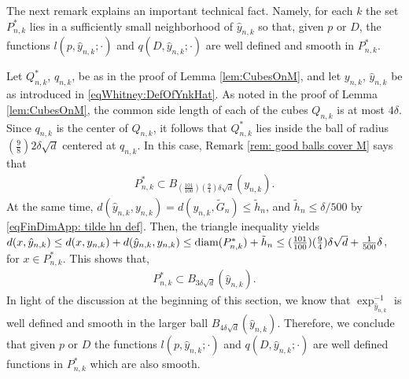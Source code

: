 \documentclass[11pt,reqno]{amsart}
\numberwithin{equation}{section}
\theoremstyle{plain}
\def\diam{\textnormal{diam}}
\begin{document}
  The next remark explains an important technical fact. Namely, for each $k$ the set $P_{n,k}^*$ lies in a sufficiently small neighborhood of $\hat y_{n,k}$ so that, given $p$ or $D$, the functions $l(p,\hat y_{n,k};\cdot)$ and $q(D,\hat y_{n,k};\cdot)$ are well defined and smooth in $P_{n,k}^*$.
  \begin{rem}\label{rem:local interpolators are well defined}
    Let $Q_{n,k}^*$, $q_{n,k}$, be as in the proof of Lemma \ref{lem:CubesOnM}, and let $y_{n,k}$, $\hat y_{n,k}$ be as introduced in \eqref{eqWhitney:DefOfYnkHat}.  As noted in the proof of Lemma \ref{lem:CubesOnM}, the common side length of each of the cubes $Q_{n,k}$ is at most $4\delta$. Since $q_{n,k}$ is the center of $Q_{n,k}$, it follows that $Q_{n,k}^*$ lies inside the ball of radius $(\tfrac{9}{8})2\delta \sqrt{d}$ centered at $q_{n,k}$. In this case, Remark \ref{rem: good balls cover M} says that
    \begin{align*}	
       P_{n,k}^* \subset B_{(\tfrac{101}{100})(\tfrac{9}{4})\delta \sqrt{d}}(y_{n,k}).
    \end{align*}	
    At the same time, $d(\hat y_{n,k},y_{n,k}) = d(y_{n,k},\tilde G_n)\leq \tilde h_n$, and $\tilde h_n \leq \delta/500$ by \eqref{eqFinDimApp: tilde hn def}. Then, the triangle inequality yields $d(x,\hat y_{n,k}) \leq d(x,y_{n,k})+d(\hat y_{n,k},y_{n,k})\leq \diam(P_{n,k}^*)+\tilde h_n \leq (\tfrac{101}{100})(\tfrac{9}{4})\delta\sqrt{d} + \tfrac{1}{500}\delta$, for $x\in P_{n,k}^*$. This shows that,
    \begin{align*}	
      P_{n,k}^* \subset B_{3\delta \sqrt{d}}(\hat y_{n,k}).
    \end{align*}	
    In light of the discussion at the beginning of this section, we know that $\exp_{\hat y_{n,k}}^{-1}$ is well defined and smooth in the larger ball $B_{4\delta \sqrt{d}}(\hat y_{n,k})$. Therefore, we conclude that given $p$ or $D$ the functions $l(p,\hat y_{n,k};\cdot)$ and $q(D,\hat y_{n,k};\cdot)$ are well defined functions in $P_{n,k}^*$ which are also smooth.

  \end{rem}
\end{document}
